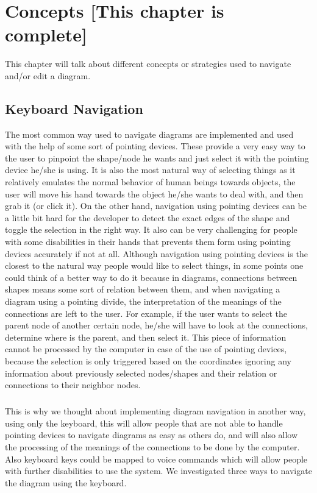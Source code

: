 \chapter{Concepts [This chapter is complete]}
\beginchapter
This chapter will talk about different concepts or strategies used to navigate and/or edit a diagram.

\section{Keyboard Navigation}
The most common way used to navigate diagrams are implemented and used with the help of some sort of pointing devices. These provide a very easy way to the user to pinpoint the shape/node he wants and just select it with the pointing device he/she is using. It is also the most natural way of selecting things as it relatively emulates the normal behavior of human beings towards objects, the user will move his hand towards the object he/she wants to deal with, and then grab it (or click it). On the other hand, navigation using pointing devices can be a little bit hard for the developer to detect the exact edges of the shape and toggle the selection in the right way. It also can be very challenging for people with some disabilities in their hands that prevents them form using pointing devices accurately if not at all. Although navigation using pointing devices is the closest to the natural way people would like to select things, in some points one could think of a better way to do it because in diagrams, connections between shapes means some sort of relation between them, and when navigating a diagram using a pointing divide, the interpretation of the meanings of the connections are left to the user. For example, if the user wants to select the parent node of another certain node, he/she will have to look at the connections, determine where is the parent, and then select it. This piece of information cannot be processed by the computer in case of the use of pointing devices, because the selection is only triggered based on the coordinates ignoring any information about previously selected nodes/shapes and their relation or connections to their neighbor nodes.

\paragraph{}
This is why we thought about implementing diagram navigation in another way, using only the keyboard, this will allow people that are not able to handle pointing devices to navigate diagrams as easy as others do, and will also allow the processing of the meanings of the connections to be done by the computer. Also keyboard keys could be mapped to voice commands which will allow people with further disabilities to use the system. We investigated three ways to navigate the diagram using the keyboard.

